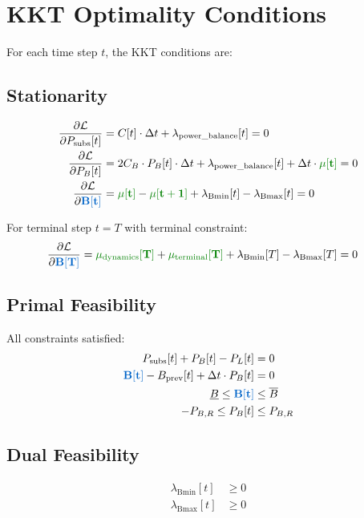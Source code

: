 \documentclass[11pt]{article}
\newcommand{\blueB}[1]{\textcolor{bluevar}{\mathbf{#1}}}      %
\newcommand{\greenmu}[1]{\textcolor{greenvar}{\mathbf{#1}}}   %
\begin{document}
\section{KKT Optimality Conditions}

For each time step $t$, the KKT conditions are:

\subsection{Stationarity}
\begin{align}
\frac{\partial \mathcal{L}}{\partial P_{\text{subs}}[t]} &= C[t] \cdot \Delta t + \lambda_{\text{power\_balance}}[t] = 0 \\
\frac{\partial \mathcal{L}}{\partial P_B[t]} &= 2 C_B \cdot P_B[t] \cdot \Delta t + \lambda_{\text{power\_balance}}[t] + \Delta t \cdot \greenmu{\mu[t]} = 0 \\
\frac{\partial \mathcal{L}}{\partial \blueB{B[t]}} &= \greenmu{\mu[t]} - \greenmu{\mu[t+1]} + \lambda_{\text{Bmin}}[t] - \lambda_{\text{Bmax}}[t] = 0
\end{align}

For terminal step $t = T$ with terminal constraint:
\begin{align}
\frac{\partial \mathcal{L}}{\partial \blueB{B[T]}} &= \greenmu{\mu_{\text{dynamics}}[T]} + \greenmu{\mu_{\text{terminal}}[T]} + \lambda_{\text{Bmin}}[T] - \lambda_{\text{Bmax}}[T] = 0
\end{align}

\subsection{Primal Feasibility}
All constraints satisfied:
\begin{align}
P_{\text{subs}}[t] + P_B[t] - P_L[t] &= 0 \\
\blueB{B[t]} - B_{\text{prev}}[t] + \Delta t \cdot P_B[t] &= 0 \\
\underline{B} \leq \blueB{B[t]} &\leq \overline{B} \\
-P_{B,R} \leq P_B[t] &\leq P_{B,R}
\end{align}

\subsection{Dual Feasibility}
\begin{align}
\lambda_{\text{Bmin}}[t] &\geq 0 \\
\lambda_{\text{Bmax}}[t] &\geq 0
\end{align}
\end{document}
